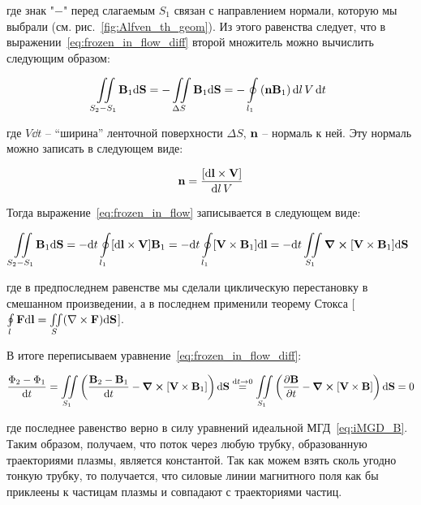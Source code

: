\documentclass[10pt, a4paper]{article}
\begin{document}
где знак "$-$" перед слагаемым $S_1$ связан с направлением нормали, которую мы выбрали (см. рис.~\ref{fig:Alfven_th_geom}). Из этого равенства следует, что в выражении~\eqref{eq:frozen_in_flow_diff} второй множитель можно вычислить следующим образом:

\begin{equation} \label{eq:frozen_in_flow}	
	\iint\limits_{S_2 - S_1}\vb{B}_1\dd\vb{S} = -\iint\limits_{\Delta S} \vb{B}_1\dd\vb{S} = -\oint\limits_{l_1} \left( \vb{n}\vb{B}_1 \right) \dd l\,V\,\dd t
\end{equation}

где $V\dd t$ -- ``ширина'' ленточной поверхности $\Delta S$, $\vb{n}$ -- нормаль к ней. Эту нормаль можно записать в следующем виде:

\begin{equation*}
	\vb{n} = \frac{[\dd\vb{l}\times\vb{V}]}{\dd l\, V}
\end{equation*}

Тогда выражение~\eqref{eq:frozen_in_flow} записывается в следующем виде:

\begin{equation*}
	\iint\limits_{S_2 - S_1}\vb{B}_1\dd\vb{S} = -\dd t \oint\limits_{l_1} [\dd\vb{l}\times\vb{V}]\vb{B}_1 = -\dd t \oint\limits_{l_1} [\vb{V}\times\vb{B}_1]\dd\vb{l} = -\dd t\iint\limits_{S_1}\curl[\vb{V}\times\vb{B}_1] \dd\vb{S}
\end{equation*}

где в предпоследнем равенстве мы сделали циклическую перестановку в смешанном произведении, а в последнем применили теорему Стокса [$\oint\limits_{l} \vb{F} \dd\vb{l} = \iint\limits_S (\nabla
\times\vb{F})\dd\vb{S}$].

В итоге переписываем уравнение~\eqref{eq:frozen_in_flow_diff}:

\begin{equation*}
	\frac{\Phi_2 - \Phi_1}{\dd t} = \iint\limits_{S_1}\left( \frac{\vb{B}_2 - \vb{B}_1}{\dd t} - \curl[\vb{V}\times\vb{B}_1] \right)\dd\vb{S} \stackrel{\dd t\rightarrow 0}{=} \iint\limits_{S_1}\left( \pdv{\vb{B}}{t} - \curl[\vb{V}\times\vb{B}] \right)\dd\vb{S} = 0
\end{equation*}

где последнее равенство верно в силу уравнений идеальной МГД~\eqref{eq:iMGD_B}. Таким образом, получаем, что поток через любую трубку, образованную траекториями плазмы, является константой. Так как можем взять сколь угодно тонкую трубку, то получается, что силовые линии магнитного поля как бы приклеены к частицам плазмы и совпадают с траекториями частиц.
\end{document}
